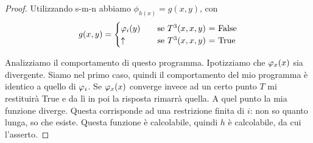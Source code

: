 \begin{proof}
    Utilizzando s-m-n abbiamo $\phi_{h(x)} = g(x,y)$, con
    \begin{equation*}
        g(x,y) =
        \begin{cases}
            \varphi_{i}(y) \quad &\text{se $T^{3}(x,x,y)$ = False}\\
            \uparrow \quad &\text{se $T^{3}(x,x,y)$ = True}
        \end{cases}
    \end{equation*}

    Analizziamo il comportamento di questo programma. Ipotizziamo che $\varphi_{x}(x)$ sia divergente.
    Siamo nel primo caso, quindi il comportamento del mio programma è identico a quello di $\varphi_{i}$.
    Se $\varphi_{x}(x)$ converge invece ad un certo punto $T$ mi restituirà True e da lì in poi la
    risposta rimarrà quella. A quel punto la mia funzione diverge. Questa corrisponde ad una
    restrizione finita di $i$: non so quanto lunga, so che esiste. Questa funzione è calcolabile,
    quindi $h$ è calcolabile, da cui l'asserto.
\end{proof}
